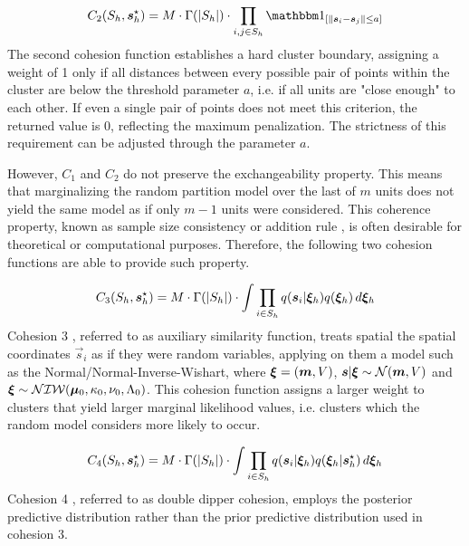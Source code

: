\documentclass[12pt,	%
	a4paper,		%
	twoside,		%
	openright,		%
	titlepage,%
	]{book}
\theoremstyle{definition}
\let\cite\citep
\begin{document}
\begin{equation}    
C_2(S_{h},\vec{s}_{h}^\star) = M \cdot \Gamma(|S_h|) \cdot \prod_{i,j \in S_h} \indicator{\| \vec{s}_i - \vec{s}_j \| \leq a}
\end{equation}
The second cohesion function \cite{paper-3} establishes a hard cluster boundary, assigning a weight of 1 only if all distances between every possible pair of points within the cluster are below the threshold parameter $a$, i.e. if all units are "close enough" to each other. If even a single pair of points does not meet this criterion, the returned value is 0, reflecting the maximum penalization. The strictness of this requirement can be adjusted through the parameter $a$.

However, $C_1$ and $C_2$ do not preserve the exchangeability property. This means that marginalizing the random partition model over the last of $m$ units does not yield the same model as if only $m-1$ units were considered. This coherence property, known as sample size consistency or addition rule \cite{sample-size-consistency}, is often desirable for theoretical or computational purposes. Therefore, the following two cohesion functions are able to provide such property.

\begin{equation}    
C_3(S_{h},\boldsymbol{s}_{h}^\star) = M \cdot \Gamma(|S_h|) \cdot \int \prod_{i \in S_h} q(\boldsymbol{s}_i|\boldsymbol{\xi}_h) q(\boldsymbol{\xi}_h) \, d\boldsymbol{\xi}_h
\end{equation}
Cohesion 3 \cite{paper2}, referred to as auxiliary similarity function, treats spatial the spatial coordinates $\vec{s}_i$ as if they were random variables, applying on them a model such as the Normal/Normal-Inverse-Wishart, where $\boldsymbol{\xi} = (\boldsymbol{m},V)$, $\boldsymbol{s}|\boldsymbol{\xi} \sim \mathcal{N}(\boldsymbol{m},V)$ and $\boldsymbol{\xi} \sim \mathcal{NIW}( \boldsymbol{\mu}_0,\kappa_0, \nu_0, \Lambda_0)$. This cohesion function assigns a larger weight to clusters that yield larger marginal likelihood values, i.e. clusters which the random model considers more likely to occur.

\begin{equation}    
C_4(S_{h},\boldsymbol{s}_{h}^\star) = M \cdot \Gamma(|S_h|) \cdot \int \prod_{i \in S_h} q(\boldsymbol{s}_i|\boldsymbol{\xi}_h) q(\boldsymbol{\xi}_h|\boldsymbol{s}_h^\star) \, d\boldsymbol{\xi}_h
\end{equation}
Cohesion 4 \cite{paper-37}, referred to as double dipper cohesion, employs the posterior predictive distribution rather than the prior predictive distribution used in cohesion 3.
\end{document}
